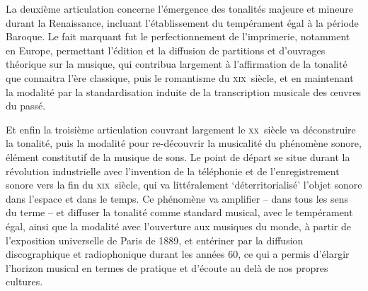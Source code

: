 \documentclass{article}
\begin{document}
La deuxième articulation concerne l'émergence des tonalités majeure et mineure durant la Renaissance, incluant l'établissement du tempérament égal à la période Baroque. Le fait marquant fut le perfectionnement de l'imprimerie, notamment en Europe, permettant l'édition et la diffusion de partitions et d'ouvrages théorique sur la musique, qui contribua largement à l'affirmation de la tonalité que connaitra l'ère classique, puis le romantisme du \textsc{xix}\ieme ~siècle, et en maintenant la modalité par la standardisation induite de la transcription musicale des œuvres du passé.

Et enfin la troisième articulation couvrant largement le \textsc{xx}\ieme ~siècle va déconstruire la tonalité, puis la modalité pour re-découvrir la musicalité du phénomène sonore, élément constitutif de la musique de sons. Le point de départ se situe durant la révolution industrielle avec l'invention de la téléphonie et de l'enregistrement sonore vers la fin du \textsc{xix}\ieme ~siècle, qui va littéralement `déterritorialisé' %
 l'objet sonore dans l'espace et dans le temps. Ce phénomène va amplifier -- dans tous les sens du terme -- et %
 diffuser la tonalité comme standard musical, avec le tempérament égal, ainsi que la modalité avec l’ouverture aux musiques du monde, %
 à partir de l’exposition universelle de Paris de 1889, et entériner par la diffusion discographique et radiophonique durant les années 60, ce qui a permis d’élargir l’horizon musical en termes de pratique et d’écoute au delà de nos propres cultures.%
\end{document}
